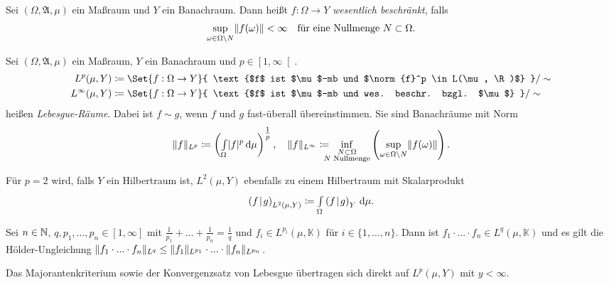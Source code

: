 \documentclass{cheat-sheet}
\newcommand{\K}{\mathbb{K}}
\newcommand{\scp}[2]{\left( #1 \!\mid\! #2 \right)} %
\newcommand{\Alg}{\mathfrak{A}} %
\begin{document}
\begin{defn}
  Sei $(\Omega, \Alg, \mu)$ ein Maßraum und $Y$ ein Banachraum. Dann heißt $f : \Omega \to Y$ \emph{wesentlich beschränkt}, falls
  \[ \sup_{\omega \in \Omega \setminus N} \lVert f(\omega)\rVert < \infty \quad \text{für eine Nullmenge $N \subset \Omega$.} \]
\end{defn}

\begin{defn}
  Sei $(\Omega, \Alg, \mu)$ ein Maßraum, $Y$ ein Banachraum und $p \in \left[ 1, \infty \right[$.
  \begin{align*}
    L^p(\mu, Y) &\coloneqq \Set{ f : \Omega \to Y }{ \text{$f$ ist $\mu$-mb und $\norm{f}^p \in L(\mu, \R)$} } / \sim \\
    L^\infty(\mu, Y) &\coloneqq \Set{ f : \Omega \to Y }{ \text{$f$ ist $\mu$-mb und wes. beschr. bzgl. $\mu$} } / \sim
  \end{align*}
  heißen \emph{Lebesgue-Räume}. Dabei ist $f \sim g$, wenn $f$ und $g$ fast-überall übereinstimmen. Sie sind Banachräume mit Norm
  \[
    \lVert f\rVert_{L^p} \coloneqq \left( {\textstyle \int\limits_{\Omega}^{}} \lvert f\rvert^p \,\mathrm{d} \mu \right)^{\tfrac{1}{p}},
    \quad
    \lVert f\rVert_{L^\infty} \coloneqq \!\!\!\!\! \inf_{\substack{N \subset \Omega \\ N \text{ Nullmenge}}} \left( \sup_{\omega \in \Omega \setminus N} \lVert f(\omega)\rVert \right).
  \]
\end{defn}


\begin{bem}
  Für $p {=} 2$ wird, falls $Y$ ein Hilbertraum ist, $L^2(\mu, Y)$ ebenfalls zu einem Hilbertraum mit Skalarprodukt
  \[ \scp{f}{g}_{L^2(\mu, Y)} \coloneqq \Int{\Omega}{}{\scp{f}{g}_Y}{\mu}. \]
\end{bem}

\begin{satz}
  Sei $n \in \mathbb{N}$, $q, p_1, ..., p_n \in \left[ 1, \infty \right]$ mit $\tfrac{1}{p_1} + ... + \tfrac{1}{p_n} = \tfrac{1}{q}$ und $f_i \in L^{p_i}(\mu, \K)$ für $i \in \{ 1, ..., n \}$. Dann ist $f_1 \cdot ... \cdot f_n \in L^q(\mu, \K)$ und es gilt die Hölder-Ungleichung $\lVert f_1 \cdot ... \cdot f_n\rVert_{L^q} \leq \lVert f_1\rVert_{L^{p_1}} \cdot ... \cdot \lVert f_n\rVert_{L^{p_n}}$.
\end{satz}

\begin{bem}
  Das Majorantenkriterium sowie der Konvergenzsatz von Lebesgue übertragen sich direkt auf $L^p(\mu, Y)$ mit $y < \infty$.
\end{bem}
\end{document}
